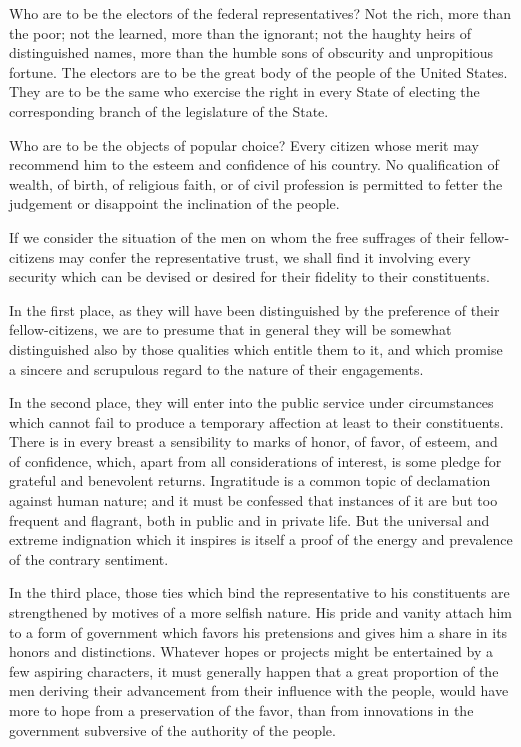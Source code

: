 Who are to be the electors of the federal representatives? 
Not the rich, more than the poor; not the learned, more than the ignorant; not the haughty heirs of distinguished names, more than the humble sons of obscurity and unpropitious fortune. 
The electors are to be the great body of the people of the United States. 
They are to be the same who exercise the right in every State of electing the corresponding branch of the legislature of the State.

Who are to be the objects of popular choice? 
Every citizen whose merit may recommend him to the esteem and confidence of his country. 
No qualification of wealth, of birth, of religious faith, or of civil profession is permitted to fetter the judgement or disappoint the inclination of the people.

If we consider the situation of the men on whom the free suffrages of their fellow-citizens may confer the representative trust, we shall find it involving every security which can be devised or desired for their fidelity to their constituents.

In the first place, as they will have been distinguished by the preference of their fellow-citizens, we are to presume that in general they will be somewhat distinguished also by those qualities which entitle them to it, and which promise a sincere and scrupulous regard to the nature of their engagements.

In the second place, they will enter into the public service under circumstances which cannot fail to produce a temporary affection at least to their constituents. 
There is in every breast a sensibility to marks of honor, of favor, of esteem, and of confidence, which, apart from all considerations of interest, is some pledge for grateful and benevolent returns. 
Ingratitude is a common topic of declamation against human nature; and it must be confessed that instances of it are but too frequent and flagrant, both in public and in private life. 
But the universal and extreme indignation which it inspires is itself a proof of the energy and prevalence of the contrary sentiment.

In the third place, those ties which bind the representative to his constituents are strengthened by motives of a more selfish nature. 
His pride and vanity attach him to a form of government which favors his pretensions and gives him a share in its honors and distinctions. 
Whatever hopes or projects might be entertained by a few aspiring characters, it must generally happen that a great proportion of the men deriving their advancement from their influence with the people, would have more to hope from a preservation of the favor, than from innovations in the government subversive of the authority of the people.

